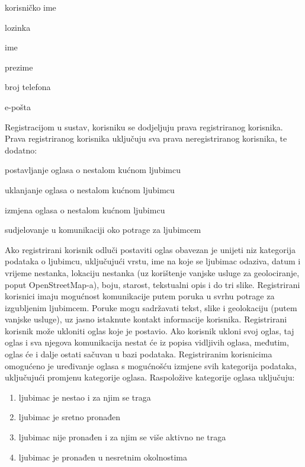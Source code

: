\begin{packed_item}
	\item korisničko ime
	\item lozinka
	\item ime
	\item prezime
	\item broj telefona
	\item e-pošta
\end{packed_item}

Registracijom u sustav, korisniku se dodjeljuju prava registriranog korisnika. Prava registriranog korisnika uključuju sva prava neregistriranog korisnika, te dodatno:

\begin{packed_item}
	\item postavljanje oglasa o nestalom kućnom ljubimcu
	\item uklanjanje oglasa o nestalom kućnom ljubimcu
	\item izmjena oglasa o nestalom kućnom ljubimcu
	\item sudjelovanje u komunikaciji oko potrage za ljubimcem
\end{packed_item}

Ako registrirani korisnik odluči postaviti oglas obavezan je unijeti niz kategorija podataka o ljubimcu, uključujući vrstu, ime na koje se ljubimac odaziva, datum i vrijeme nestanka, lokaciju nestanka (uz korištenje vanjske usluge za geolociranje, poput OpenStreetMap-a), boju, starost, tekstualni opis i do tri slike. Registrirani korisnici imaju mogućnost komunikacije putem poruka u svrhu potrage za izgubljenim ljubimcem. Poruke mogu sadržavati tekst, slike i geolokaciju (putem vanjske usluge), uz jasno istaknute kontakt informacije korisnika. Registrirani korisnik može ukloniti oglas koje je postavio. Ako korisnik ukloni svoj oglas, taj oglas i sva njegova komunikacija nestat će iz popisa vidljivih oglasa, međutim, oglas će i dalje ostati sačuvan u bazi podataka. Registriranim korisnicima omogućeno je uređivanje oglasa s mogućnošću izmjene svih kategorija podataka, uključujući promjenu kategorije oglasa. Raspoložive kategorije oglasa uključuju:

\begin{enumerate}
	\item ljubimac je nestao i za njim se traga
	\item ljubimac je sretno pronađen
	\item ljubimac nije pronađen i za njim se više aktivno ne traga
	\item ljubimac je pronađen u nesretnim okolnostima
\end{enumerate}

